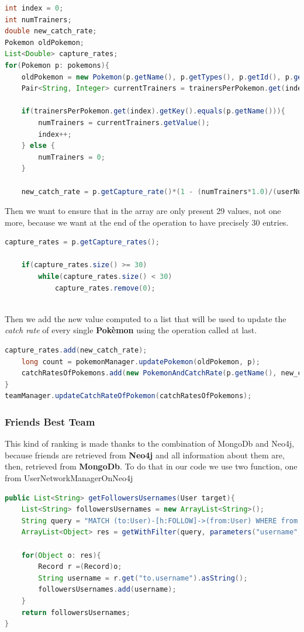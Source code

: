 \begin{lstlisting}[language=Java]
int index = 0;
int numTrainers;
double new_catch_rate;
Pokemon oldPokemon;
List<Double> capture_rates;
for(Pokemon p: pokemons){
	oldPokemon = new Pokemon(p.getName(), p.getTypes(), p.getId(), p.getCapture_rate(), p.getCapture_rates(), (int)p.getHeight(), (int)p.getWeight(), p.getBiology(), p.getPortrait(), p.getSprite());
	Pair<String, Integer> currentTrainers = trainersPerPokemon.get(index);
	
	if(trainersPerPokemon.get(index).getKey().equals(p.getName())){
		numTrainers = currentTrainers.getValue();
		index++;
	} else {
		numTrainers = 0;
	}
	
	new_catch_rate = p.getCapture_rate()*(1 - (numTrainers*1.0)/(userNumber));

\end{lstlisting}

Then we want to ensure that in the array are only present 29 values, not one more, because we want at the end of the operation to have precisely 30 entries.

\begin{lstlisting}[language=Java]
	capture_rates = p.getCapture_rates();
	
	if(capture_rates.size() >= 30)
		while(capture_rates.size() < 30)
			capture_rates.remove(0);
	
\end{lstlisting}
Then we add the new value computed to a list that will be used to update the \textit{catch rate} of every single \textbf{Pokèmon} using the operation called at last.
\begin{lstlisting}[language=Java]
	capture_rates.add(new_catch_rate);
	long count = pokemonManager.updatePokemon(oldPokemon, p);
	catchRatesOfPokemons.add(new PokemonAndCatchRate(p.getName(), new_catch_rate));
}
teamManager.updateCatchRateOfPokemon(catchRatesOfPokemons);
\end{lstlisting}

\subsubsection{Friends Best Team}
This kind of ranking is made thanks to the combination of MongoDb and Neo4j, because friends are retrieved from \textbf{Neo4j} and all information about them are, then, retrieved from \textbf{MongoDb}. To do that in our code we use two function, one from UserNetworkManagerOnNeo4j

\begin{lstlisting}[language=Java]
public List<String> getFollowersUsernames(User target){
	List<String> followersUsernames = new ArrayList<String>();
	String query = "MATCH (to:User)-[h:FOLLOW]->(from:User) WHERE from.username = $username RETURN to.username";
	ArrayList<Object> res = getWithFilter(query, parameters("username", target.getUsername()));
	
	for(Object o: res){
		Record r =(Record)o;
		String username = r.get("to.username").asString();
		followersUsernames.add(username);
	}
	return followersUsernames;
}
\end{lstlisting}


